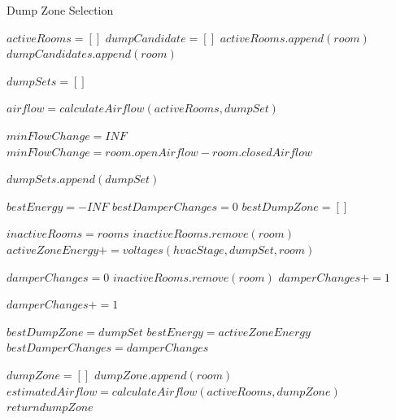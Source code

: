 \begin{algorithm}                      %
\caption{Dump Zone Selection}          %
\label{alg:dumpZoneSelection}%
\begin{algorithmic}                    %
\STATE $activeRooms = []$
\STATE $dumpCandidate = []$
\STATE $activeRooms.append(room)$
\ELSE
\STATE $dumpCandidates.append(room)$
\ENDIF
\ENDFOR

\STATE $dumpSets = []$


\STATE $airflow = calculateAirflow(activeRooms, dumpSet)$

\STATE $minFlowChange = INF$
\STATE $minFlowChange = room.openAirflow - room.closedAirflow$
\ENDIF
\ENDFOR

\STATE $dumpSets.append(dumpSet)$
\ENDIF

\ENDFOR

\STATE $bestEnergy = -INF$
\STATE $bestDamperChanges = 0$
\STATE $bestDumpZone = []$

\STATE $inactiveRooms = rooms$
\STATE $inactiveRooms.remove(room)$
\STATE $activeZoneEnergy += voltages(hvacStage, dumpSet, room)$
\ENDFOR

\STATE $damperChanges = 0$
\STATE $inactiveRooms.remove(room)$
\STATE $damperChanges += 1$
\ENDIF
\ENDFOR

\STATE $damperChanges += 1$
\ENDIF
\ENDFOR

\STATE $bestDumpZone = dumpSet$
\STATE $bestEnergy = activeZoneEnergy$
\STATE $bestDamperChanges = damperChanges$
\ENDIF

\ENDFOR

\STATE $dumpZone = []$
\STATE $dumpZone.append(room)$
\STATE $estimatedAirflow = calculateAirflow(activeRooms, dumpZone)$
\STATE $return dumpZone$
\ENDIF
\ENDFOR

\end{algorithmic}
\end{algorithm}

